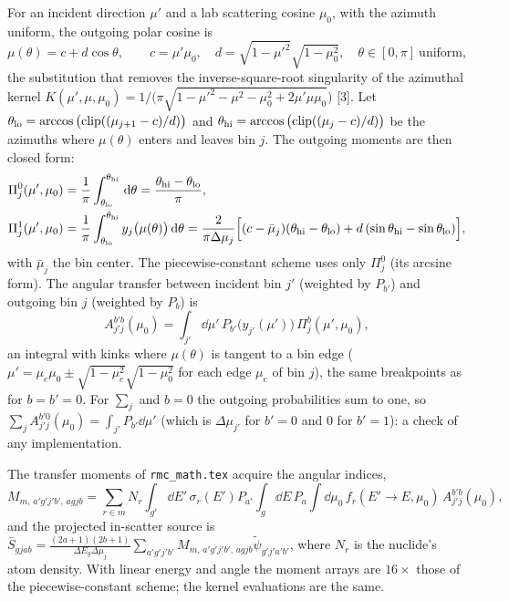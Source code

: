 \documentclass[11pt]{article}
\newcommand{\tpsi}{\tilde\psi}
\newcommand{\Sbar}{\bar S}
\begin{document}
For an incident direction $\mu'$ and a lab scattering cosine $\mu_0$, with the azimuth
uniform, the outgoing polar cosine is
\begin{equation}
  \mu(\theta) = c + d\cos\theta,\qquad c=\mu'\mu_0,\quad d=\sqrt{1-\mu'^2}\sqrt{1-\mu_0^2},
  \quad\theta\in[0,\pi]\ \text{uniform},
\end{equation}
the substitution that removes the inverse-square-root singularity of the azimuthal
kernel $K(\mu',\mu,\mu_0) = 1/\big(\pi\sqrt{1-\mu'^2-\mu^2-\mu_0^2+2\mu'\mu\mu_0}\big)$
[3]. Let $\theta_{\rm lo}=\arccos\big(\mathrm{clip}((\mu_{j+1}-c)/d)\big)$ and
$\theta_{\rm hi}=\arccos\big(\mathrm{clip}((\mu_j-c)/d)\big)$ be the azimuths where
$\mu(\theta)$ enters and leaves bin $j$. The outgoing moments are then closed form:
\begin{align}
  \Pi^{0}_j(\mu',\mu_0) &= \frac1\pi\int_{\theta_{\rm lo}}^{\theta_{\rm hi}}\,\mathrm{d}\theta
  = \frac{\theta_{\rm hi}-\theta_{\rm lo}}{\pi},\\
  \Pi^{1}_j(\mu',\mu_0) &= \frac1\pi\int_{\theta_{\rm lo}}^{\theta_{\rm hi}}
  y_j\big(\mu(\theta)\big)\,\mathrm{d}\theta
  = \frac{2}{\pi\Delta\mu_j}\Big[(c-\bar\mu_j)(\theta_{\rm hi}-\theta_{\rm lo})
  + d\,(\sin\theta_{\rm hi}-\sin\theta_{\rm lo})\Big],
\end{align}
with $\bar\mu_j$ the bin center. The piecewise-constant scheme uses only $\Pi^0_j$ (its
arcsine form). The angular transfer between incident bin $j'$ (weighted by
$P_{b'}$) and outgoing bin $j$ (weighted by $P_b$) is
\begin{equation}
  A^{b'b}_{j'j}(\mu_0) = \int_{j'}\dd\mu'\,P_{b'}\big(y_{j'}(\mu')\big)\,
  \Pi^{b}_j(\mu',\mu_0),
\end{equation}
an integral with kinks where $\mu(\theta)$ is tangent to a bin edge
($\mu' = \mu_e\mu_0\pm\sqrt{1-\mu_e^2}\sqrt{1-\mu_0^2}$ for each edge $\mu_e$ of bin
$j$), the same breakpoints as for $b=b'=0$. For $\sum_j$ and $b=0$ the outgoing
probabilities sum to one, so $\sum_jA^{b'0}_{j'j}(\mu_0)=\int_{j'}P_{b'}\dd\mu'$ (which
is $\Delta\mu_{j'}$ for $b'=0$ and $0$ for $b'=1$): a check of any implementation.

The transfer moments of \texttt{rmc\_math.tex} acquire the angular indices,
\begin{equation}
  M_{m,\,a'g'j'b',\,agjb} = \sum_{r\in m}N_r\int_{g'}\dd E'\,\sigma_r(E')P_{a'}
  \int_g\dd E\,P_a\int\dd\mu_0\,f_r(E'\to E,\mu_0)\,A^{b'b}_{j'j}(\mu_0),
\end{equation}
and the projected in-scatter source is
$\Sbar_{gjab}=\frac{(2a+1)(2b+1)}{\Delta E_g\Delta\mu_j}
\sum_{a'g'j'b'}M_{m,\,a'g'j'b',\,agjb}\tpsi_{g'j'a'b'}$, where $N_r$ is the
nuclide's atom density. With linear
energy and angle the moment arrays are $16\times$ those of the piecewise-constant
scheme; the kernel evaluations are the same.
\end{document}
